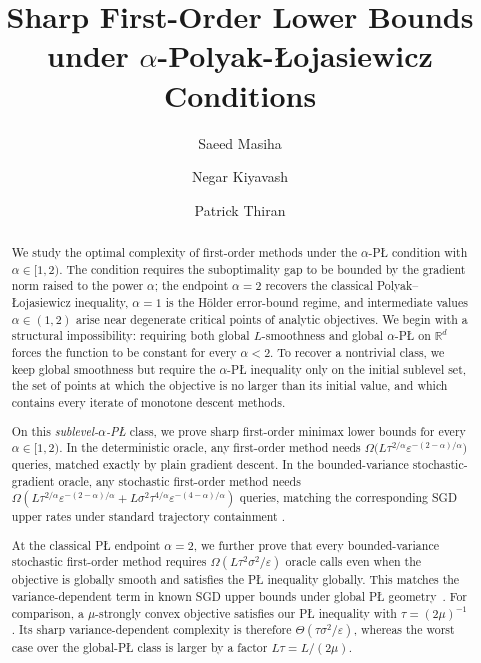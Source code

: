 \documentclass[11pt]{article}
\title{Sharp First-Order Lower Bounds under \(\alpha\)-Polyak-\L{}ojasiewicz Conditions}
\author[1]{Saeed Masiha}
\author[1]{Negar Kiyavash}
\author[2]{Patrick Thiran}
\affil[1]{EPFL School of Management of Technology}
\affil[2]{EPFL Department of Computer and Communications Sciences}
\date{}
\newcommand{\R}{\mathbb{R}}
\begin{document}
\maketitle

\begin{abstract}
We study the optimal complexity of first-order methods under the \(\alpha\)-P\L{} condition with
\(\alpha\in[1,2)\). The condition requires the suboptimality gap to be bounded by the gradient norm raised to the
power \(\alpha\); the endpoint \(\alpha=2\) recovers the classical Polyak--\L ojasiewicz inequality, \(\alpha=1\)
is the H\"older error-bound regime, and intermediate values \(\alpha\in(1,2)\) arise
near degenerate critical points of analytic objectives. We begin with a
structural impossibility: requiring both global \(L\)-smoothness and global \(\alpha\)-P\L{} on \(\R^d\) forces the
function to be constant for every \(\alpha<2\). To recover a nontrivial class, we keep global smoothness but require the
\(\alpha\)-P\L{} inequality only on the initial sublevel set, the set of points at which the objective is no larger
than its initial value, and which contains every iterate of monotone descent methods.

On this \emph{sublevel-\(\alpha\)-P\L{}} class, we prove sharp first-order minimax lower bounds for every
\(\alpha\in[1,2)\). In the deterministic oracle, any first-order method needs
\(\Omega\bigl(L\tau^{2/\alpha}\varepsilon^{-(2-\alpha)/\alpha}\bigr)\) queries, matched exactly by plain gradient
descent. In the bounded-variance stochastic-gradient oracle, any stochastic first-order method needs $\Omega\left(
L\tau^{2/\alpha}\varepsilon^{-(2-\alpha)/\alpha}
 + L\sigma^2\tau^{4/\alpha}\varepsilon^{-(4-\alpha)/\alpha}
\right)$ queries, matching the corresponding SGD upper
rates under standard trajectory containment \citep{FatkhullinEtesamiHeKiyavash2022}.

At the classical P\L{} endpoint \(\alpha=2\), we further prove that every bounded-variance stochastic
first-order method requires \(\Omega(L\tau^2\sigma^2/\varepsilon)\) oracle calls even when the objective is globally
smooth and satisfies the P\L{} inequality globally. This matches the variance-dependent term in known SGD upper bounds
under global P\L{} geometry~\citep{FatkhullinEtesamiHeKiyavash2022}. For comparison, a \(\mu\)-strongly convex
objective satisfies our P\L{} inequality with \(\tau=(2\mu)^{-1}\). Its sharp variance-dependent complexity is
therefore \(\Theta(\tau\sigma^2/\varepsilon)\), whereas the worst case over the global-P\L{} class is larger by a
factor \(L\tau=L/(2\mu)\).
\end{abstract}
\end{document}
